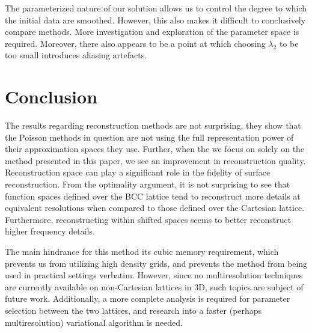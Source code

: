 The parameterized nature of our solution allows us to control the degree to which the initial data are smoothed.
However, this also makes it difficult to conclusively compare methods. 
More investigation and exploration of the parameter space is required. 
Moreover, there also appears to be a point at which choosing $\lambda_2$ to be too small introduces aliasing artefacts.  


\section{Conclusion}
The results regarding reconstruction methods are not surprising, they show that the Poisson methods in question are not using the full representation power of their approximation spaces they use. 
Further, when the we focus on solely on the method presented in this paper, we see an improvement in reconstruction quality. 
Reconstruction space can play a significant role in the fidelity of surface reconstruction. 
From the optimality argument, it is not surprising to see that function spaces defined over the BCC lattice tend to reconstruct more details at equivalent resolutions when compared to those defined over the Cartesian lattice.
Furthermore, reconstructing within shifted spaces seems to better reconstruct higher frequency details.

The main hindrance for this method its cubic memory requirement, which prevents us from utilizing high density grids, and prevents the method from being used in practical settings verbatim. 
However, since no multiresolution techniques are currently available on non-Cartesian lattices in 3D, such topics are subject of future work. 
Additionally, a more complete analysis is required for parameter selection between the two lattices, and research into a faster (perhaps multiresolution) variational algorithm is needed.
